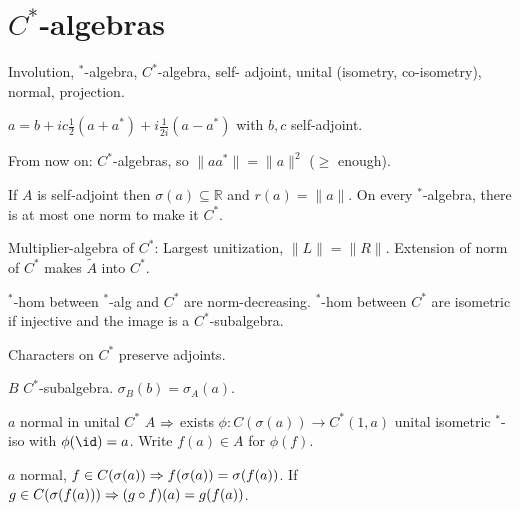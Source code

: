 \documentclass[a4paper, twocolumn, 10pt]{article}
\begin{document}
\section{$C^*$-algebras}

\begin{definition}
    Involution, $^*$-algebra, $C^*$-algebra, self- adjoint, unital (isometry, co-isometry), normal, projection.
\end{definition}

\begin{theorem}
    $a =b + ic \frac{1}{2} (a + a^*) + i \frac{1}{2i} (a - a^*)$ with $b,c$ self-adjoint.
\end{theorem}

From now on: $C^*$-algebras, so $\|a a^*\| = \|a\|^2$ ($\geq$ enough).

\begin{theorem}
    If $A$ is self-adjoint then $\sigma(a) \subseteq \mathds{R}$ and $r(a) = \|a\|$. On every $^*$-algebra, there is at most one norm to make it $C^*$.
\end{theorem}

\begin{theorem}
    Multiplier-algebra of $C^*$: Largest unitization, $\|L\| = \|R\|$.
    Extension of norm of $C^*$ makes $\tilde{A}$ into $C^*$.
\end{theorem}

\begin{theorem}
    $^*$-hom between $^*$-alg and $C^*$ are norm-decreasing. $^*$-hom between $C^*$ are isometric if injective and the image is a $C^*$-subalgebra.
\end{theorem}

\begin{theorem}
    Characters on $C^*$ preserve adjoints.
\end{theorem}

\begin{theorem}
    $B$ $C^*$-subalgebra. $\sigma_B(b) = \sigma_A(a)$.
\end{theorem}

\begin{theorem}
    $a$ normal in unital $C^*$ $A$ $\Rightarrow$ exists $\phi: C(\sigma(a)) \to C^*(1,a)$ unital isometric $^*$-iso with $\phi(\id) = a$.
    Write $f(a) \in A$ for $\phi(f)$.
\end{theorem}

\begin{theorem}
    $a$ normal, $f \in C(\sigma(a)) \Rightarrow f(\sigma(a)) = \sigma(f(a))$. If $g \in C(\sigma(f(a))) \Rightarrow (g \circ f)(a) = g(f(a))$.
\end{theorem}
\end{document}
